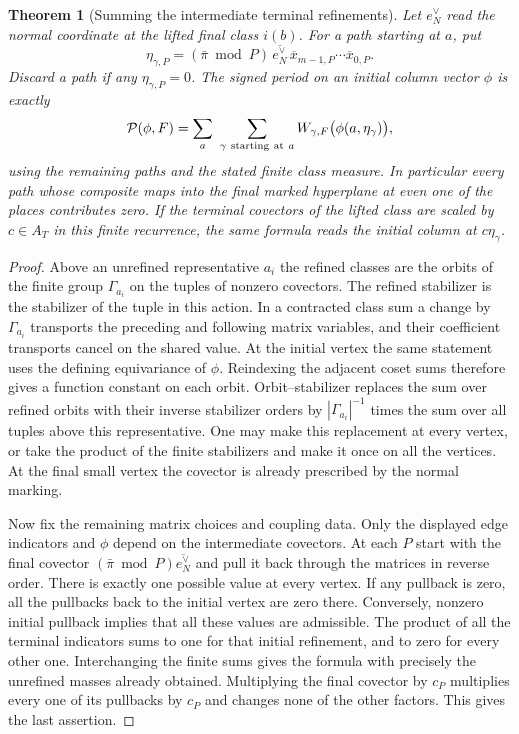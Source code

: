 \documentclass[a4paper,11pt]{article}
\newtheorem{theorem}[proposition]{Theorem}
\theoremstyle{definition}
\theoremstyle{remark}
\numberwithin{equation}{section}
\begin{document}
\begin{theorem}[Summing the intermediate terminal refinements]\leavevmode
\label{thm:covectorpaths352}
Let \(e_N^\vee\) read the normal coordinate at the lifted final
class \(i(b)\). For a path starting at \(a\), put
\[
 \eta_{\gamma,P}=(\bar\pi\bmod P)\,\overline{e_N^\vee}\,
       \overline{x}_{m-1,P}\cdots\overline{x}_{0,P}.
\]
Discard a path if any \(\eta_{\gamma,P}=0\). The signed period
on an initial column vector \(\phi\) is exactly
\[
             \mathcal P(\phi,F)
           = \sum_{a}\ \sum_{\gamma\ {\rm starting\ at}\ a}
                  W_{\gamma,F}\big(\phi(a,\eta_\gamma)\big),
\]
using the remaining paths and the stated finite class measure.
In particular every path whose composite maps into the final
marked hyperplane at even one of the places contributes zero.
If the terminal covectors of the lifted class are scaled by
\(c\in A_T\) in this finite recurrence, the same formula reads
the initial column at \(c\eta_\gamma\).
\end{theorem}
\begin{proof}
Above an unrefined representative \(a_i\) the refined classes
are the orbits of the finite group \(\Gamma_{a_i}\) on the
tuples of nonzero covectors. The refined stabilizer is the
stabilizer of the tuple in this action. In a contracted class
sum a change by \(\Gamma_{a_i}\) transports the preceding and
following matrix variables, and their coefficient transports
cancel on the shared value. At the initial vertex the same
statement uses the defining equivariance of \(\phi\).
Reindexing the adjacent coset sums therefore gives a function
constant on each orbit. Orbit--stabilizer replaces the sum over
refined orbits with their inverse stabilizer orders by
\(|\Gamma_{a_i}|^{-1}\) times the sum over all tuples above
this representative. One may make this replacement at every
vertex, or take the product of the finite stabilizers and make
it once on all the vertices. At the final small vertex the
covector is already prescribed by the normal marking.

Now fix the remaining matrix choices and coupling data. Only
the displayed edge indicators and \(\phi\) depend on the
intermediate covectors. At each \(P\) start with the final
covector \((\bar\pi\bmod P)\overline{e_N^\vee}\) and pull
it back through the matrices in reverse order. There is exactly
one possible value at every vertex. If any pullback is zero,
all the pullbacks back to the initial vertex are zero there.
Conversely, nonzero initial pullback implies that all these
values are admissible. The product of all the terminal
indicators sums to one for that initial refinement, and to
zero for every other one. Interchanging the finite sums gives
the formula with precisely the unrefined masses already obtained.
Multiplying the final covector by \(c_P\) multiplies every
one of its pullbacks by \(c_P\) and changes none of the other
factors. This gives the last assertion.
\end{proof}
\end{document}
